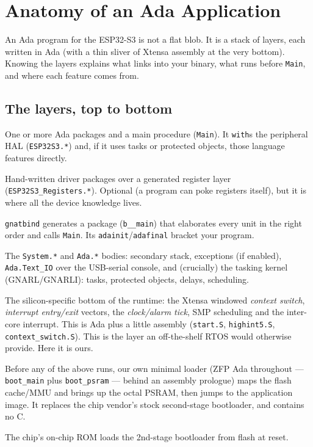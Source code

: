 \chapter{Anatomy of an Ada Application}
\label{ch:anatomy}

An Ada program for the ESP32-S3 is not a flat blob. It is a stack of layers, each
written in Ada (with a thin sliver of Xtensa assembly at the very bottom). Knowing
the layers explains what links into your binary, what runs before \texttt{Main},
and where each feature comes from.

\section{The layers, top to bottom}

\begin{description}[style=nextline]
\item[Your application.] One or more Ada packages and a main procedure
  (\texttt{Main}). It \texttt{with}s the peripheral HAL (\texttt{ESP32S3.*}) and,
  if it uses tasks or protected objects, those language features directly.
\item[The HAL (\texttt{libs/esp32s3\_hal}).] Hand-written driver packages over a
  generated register layer (\texttt{ESP32S3\_Registers.*}). Optional (a program
  can poke registers itself), but it is where all the device knowledge lives.
\item[The GNAT binder output.] \texttt{gnatbind} generates a package
  (\texttt{b\_\_main}) that elaborates every unit in the right order and calls
  \texttt{Main}. Its \texttt{adainit}/\texttt{adafinal} bracket your program.
\item[The Ada runtime (RTS).] The \texttt{System.*} and \texttt{Ada.*} bodies:
  secondary stack, exceptions (if enabled), \texttt{Ada.Text\_IO} over the
  USB-serial console, and (crucially) the tasking kernel (GNARL/GNARLI):
  tasks, protected objects, delays, scheduling.
\item[Board support.] The silicon-specific bottom of the runtime: the Xtensa
  windowed \emph{context switch}, \emph{interrupt entry/exit} vectors, the
  \emph{clock/alarm tick}, SMP scheduling and the inter-core interrupt. This is
  Ada plus a little assembly (\texttt{start.S}, \texttt{highint5.S},
  \texttt{context\_switch.S}). This is the layer an off-the-shelf RTOS would otherwise
  provide. Here it is ours.
\item[The 2nd-stage bootloader.] Before any of the above runs, our own minimal
  loader (ZFP Ada throughout --- \texttt{boot\_main} plus \texttt{boot\_psram}
  --- behind an assembly prologue) maps the flash cache/MMU and brings up the
  octal PSRAM, then jumps to the application image. It replaces the chip
  vendor's stock second-stage bootloader, and contains no C.
\item[The mask ROM.] The chip's on-chip ROM loads the 2nd-stage bootloader from
  flash at reset.
\end{description}

